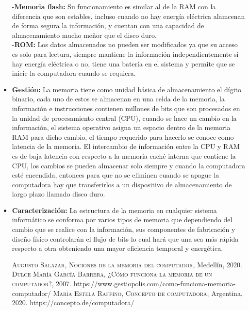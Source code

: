 \documentclass{article}
\begin{document}
\begin{flushleft}
\begin{itemize}
        -\textbf{Memoria flash:} Su funcionamiento es similar al de la RAM con la diferencia que son estables, incluso cuando no hay energía eléctrica alamcenan de forma segura la información, y cuentan con una capacidad de almacenamiento mucho meñor que el disco duro.\\
        -\textbf{ROM:} Los datos almacenados no pueden ser modificados ya que su acceso es solo para lectura, siempre mantiene la información independientemente si hay energía eléctrica o no, tiene una batería en el sistema y permite que se inicie la computadora cuando se requiera.\\
        \item \textbf{Gestión:} La memoria tiene como unidad básica de almacenamiento el dígito binario, cada uno de estos se almacenan en una celda de la memoria, la información e instrucciones contienen millones de bits que son procesados en la unidad de procesamiento central (CPU), cuando se hace un cambio en la información, el sistema operativo asigna un espacio dentro de la memoria RAM para dicho cambio, el tiempo requerido para hacerlo se conoce como latencia de la memoria. El intercambio de información entre la CPU y RAM es de baja latencia con respecto a la memoria caché interna que contiene la CPU, los cambios se pueden almacenar solo siempre y cuando la computadora esté encendida, entonces para que no se eliminen cuando se apague la computadora hay que transferirlos a un dispositivo de almacenamiento de largo plazo llamado disco duro.\\
        \item \textbf{Caracterización:} La estructura de la memoria en cualquier sistema informático se conforma por varios tipos de memoria que dependiendo del cambio que se realice con la información, sus componentes de fabricación y diseño físico controlarán el flujo de bits lo cual hará que una sea más rápida respecto a otra obteniendo una mayor eficiencia temporal y energética.
        \vfill
        \begin{thebibliography}{X}
             \textsc{Augusto Salazar},  \textsc{Nociones de la memoria del computador}, Medellín, 2020.
             \textsc{Dulce María García Barrera}, \textsc{¿Cómo funciona la memoria de un computador?}, 2007. https://www.gestiopolis.com/como-funciona-memoria-computador/
             \textsc{María Estela Raffino}, \textsc{Concepto de computadora}, Argentina, 2020. https://concepto.de/computadora/
        \end{thebibliography}
    \end{itemize}
\end{flushleft}
\end{document}
